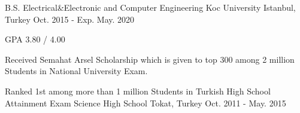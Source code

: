 

\begin{cventries}

  \cventry
    {B.S. Electrical\&Electronic and Computer Engineering} %
    {Koc University } %
    {Istanbul, Turkey} %
    {Oct. 2015 - Exp. May. 2020} %
    {
      \begin{cvitems} %
        \item {GPA 3.80 / 4.00}
        \item {Received Semahat Arsel Scholarship which is given to top 300 among 2 million Students in National University Exam.}
      \end{cvitems}
    }
    
     \cventry
    {Ranked 1st among more than 1 million Students in Turkish High School Attainment Exam}
    {Science High School} %
    {Tokat, Turkey} %
    {Oct. 2011 - May. 2015} %
    {}
\end{cventries}
